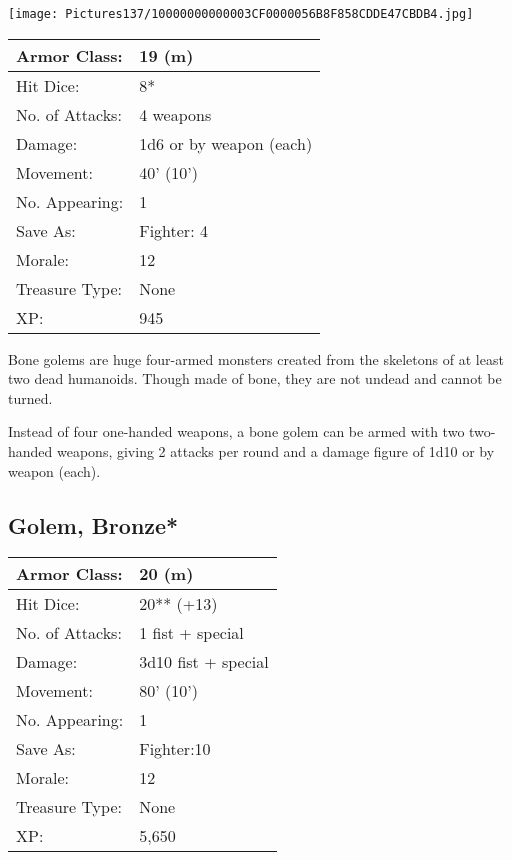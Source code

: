 \documentclass[a4paper,twoside,openany,10pt]{book}
\begin{document}
\begin{multicols}{2}
\begin{center}
	\texttt{[image: Pictures137/10000000000003CF0000056B8F858CDDE47CBDB4.jpg]}
\end{center}

\begin{center}
	\begin{tabularx}{0.48\textwidth}{@{}lX@{}}
Armor Class: & 19 (m) \\\hline
Hit Dice: & 8* \\\hline
No. of Attacks: & 4 weapons \\\hline
Damage: & 1d6 or by weapon (each) \\\hline
Movement: & 40' (10') \\\hline
No. Appearing: & 1 \\\hline
Save As: & Fighter: 4 \\\hline
Morale: & 12 \\\hline
Treasure Type: & None \\\hline
XP: & 945 \\\hline
\end{tabularx}\medskip
\end{center}

Bone golems are huge four-armed monsters created from the skeletons of at least two dead humanoids. Though made of bone, they are not undead and cannot be turned.

Instead of four one-handed weapons, a bone golem can be armed with two two-handed weapons, giving 2 attacks per round and a damage figure of 1d10 or by weapon (each).



\subsection*{Golem, Bronze*}\label{golem-bronze}

\begin{tabularx}{0.48\textwidth}{@{}lX@{}}
Armor Class: & 20 (m) \\\hline
Hit Dice: & 20** (+13) \\\hline
No. of Attacks: & 1 fist + special \\\hline
Damage: & 3d10 fist + special \\\hline
Movement: & 80' (10') \\\hline
No. Appearing: & 1 \\\hline
Save As: & Fighter:10 \\\hline
Morale: & 12 \\\hline
Treasure Type: & None \\\hline
XP: & 5,650 \\\hline
\end{tabularx}\medskip


\end{multicols}
\end{document}
